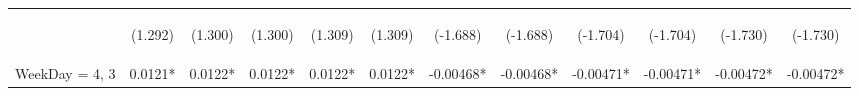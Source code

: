\documentclass[]{article}
\begin{document}
\begin{center}
\begin{tabular}{lccccccccccc}
        \vspace{4pt}     & \begin{footnotesize}(1.292)\end{footnotesize}  & \begin{footnotesize}(1.300)\end{footnotesize}  & \begin{footnotesize}(1.300)\end{footnotesize}  & \begin{footnotesize}(1.309)\end{footnotesize}  & \begin{footnotesize}(1.309)\end{footnotesize}  & \begin{footnotesize}(-1.688)\end{footnotesize}  & \begin{footnotesize}(-1.688)\end{footnotesize}  & \begin{footnotesize}(-1.704)\end{footnotesize} & \begin{footnotesize}(-1.704)\end{footnotesize} & \begin{footnotesize}(-1.730)\end{footnotesize} & \begin{footnotesize}(-1.730)\end{footnotesize} \\
        WeekDay = 4, 3   & 0.0121*                                        & 0.0122*                                        & 0.0122*                                        & 0.0122*                                        & 0.0122*                                        & -0.00468*                                       & -0.00468*                                       & -0.00471*                                      & -0.00471*                                      & -0.00472*                                      & -0.00472*                                      \\

\end{tabular}
\end{center}
\end{document}
